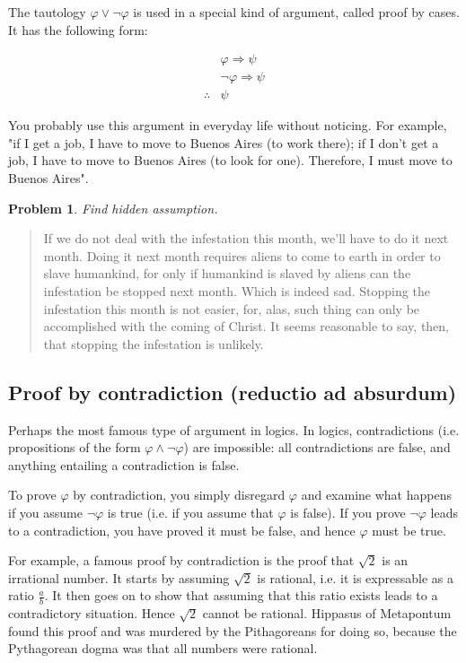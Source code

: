 \documentclass[a4paper, 12pt]{article}
\newtheorem{problem}{Problem}
\newtheorem{problem}{Problem}
\begin{document}
The tautology $\varphi \lor \neg \varphi$ is used in a special kind of 
argument, called proof by cases. It has the following 
form: 

\begin{align*}
    &\varphi \Rightarrow \psi \\ 
    &\neg \varphi \Rightarrow \psi \\ 
    \therefore  & \psi
\end{align*}

You probably use this argument in everyday life without noticing. For example,
"if I get a job, I have to move to Buenos Aires (to work there); if I don't get
a job, I have to move to Buenos Aires (to look for one). Therefore, I must move
to Buenos Aires". 

\begin{problem}
    Find hidden assumption.
\end{problem}

\begin{quote}
    If we do not deal with the infestation this month, we'll have to do it next month.
    Doing it next month requires aliens to come to earth in order to slave humankind,
    for only if humankind is slaved by aliens can the infestation be stopped next month.
    Which is indeed sad. Stopping the infestation this month is not easier, for, alas,
    such thing can only be accomplished with the coming of Christ. It seems reasonable to 
    say, then, that stopping the infestation is unlikely.
\end{quote}


\pagebreak 

\subsection{Proof by contradiction (reductio ad absurdum)}

Perhaps the most famous type of argument in logics. In logics, contradictions
(i.e. propositions of the form $\varphi \land \neg \varphi$) are impossible:
all contradictions are false, and anything entailing a contradiction is false.

To prove $\varphi$ by contradiction, you simply disregard $\varphi$ and examine
what happens if you assume $\neg \varphi$ is true (i.e. if you assume that
$\varphi$ is false). If you prove $\neg \varphi$ leads to a contradiction,
you have proved it must be false, and hence $\varphi$ must be true.

For example, a famous proof by contradiction is the proof that $\sqrt{2} $ is
an irrational number. It starts by assuming $\sqrt{2} $ is rational, i.e. it is
expressable as a ratio $\frac{a}{b}$. It then goes on to show that assuming
that this ratio exists leads to a contradictory situation. Hence $\sqrt{2} $
cannot be rational. Hippasus of Metapontum found this proof and was murdered by
the Pithagoreans for doing so, because the Pythagorean dogma was that all
numbers were rational.
\end{document}
